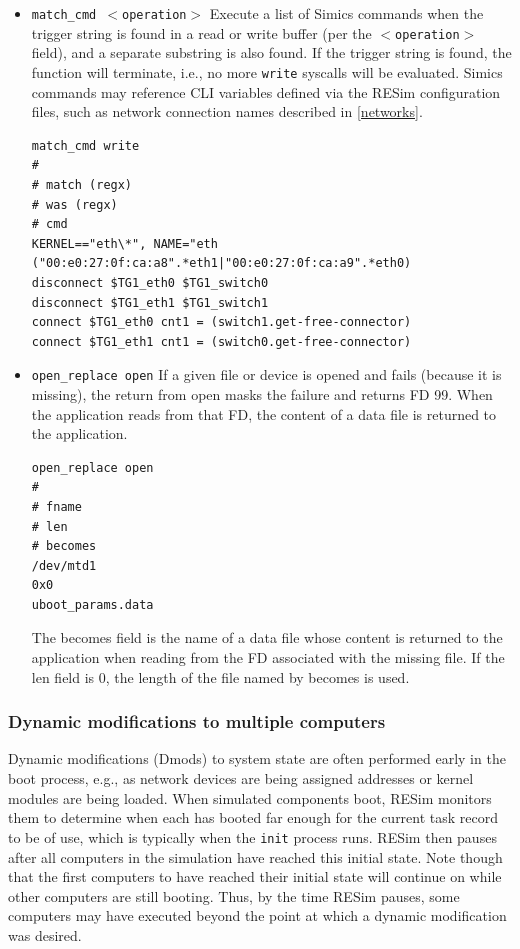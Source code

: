 \documentclass[titlepage]{article}
\begin{document}
\begin{itemize}
\item {\tt match\_cmd $<$operation$>$} Execute a list of Simics commands when the trigger string is found
in a read or write buffer (per the {\tt $<$operation$>$} field), and a separate substring is also found.  If the trigger string is
found, the function will terminate, i.e., no more {\tt write} syscalls will be evaluated.  Simics commands may reference
CLI variables defined via the RESim configuration files, such as network connection names described in \ref{networks}.
\begin{verbatim}
match_cmd write
#
# match (regx)
# was (regx)
# cmd
KERNEL=="eth\*", NAME="eth
("00:e0:27:0f:ca:a8".*eth1|"00:e0:27:0f:ca:a9".*eth0)
disconnect $TG1_eth0 $TG1_switch0
disconnect $TG1_eth1 $TG1_switch1
connect $TG1_eth0 cnt1 = (switch1.get-free-connector)
connect $TG1_eth1 cnt1 = (switch0.get-free-connector)
\end{verbatim}

\item {\tt open\_replace open} If a given file or device is opened and fails (because it is missing), the return from open
masks the failure and returns FD 99.  When the application reads from that FD, the content of a data file is returned to the application.
\begin{verbatim}
open_replace open
#
# fname
# len
# becomes
/dev/mtd1
0x0
uboot_params.data
\end{verbatim}
\noindent The becomes field is the name of a data file whose content is returned to the application when reading from the FD associated with
the missing file.  If the len field is 0, the length of the file named by becomes is used.
\end{itemize}

\subsubsection{Dynamic modifications to multiple computers}
Dynamic modifications (Dmods) to system state are often performed early in the boot process, e.g.,
as network devices are being assigned addresses or kernel modules are being loaded.
When simulated components boot, RESim monitors them to determine when each has booted far enough
for the current task record to be of use, which is typically when the {\tt init} process runs.
RESim then pauses after all computers in the simulation have reached this initial state.  Note though that
the first computers to have reached their initial state will continue on while other computers are still
booting.  Thus, by the time RESim pauses, some computers may have executed beyond the point
at which a dynamic modification was desired.
\end{document}
